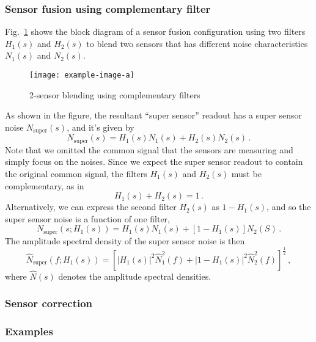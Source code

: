 \subsubsection{Sensor fusion using complementary filter \label{sec:complementary_filter}}
Fig.~\ref{fig:complementary_filter} shows the block diagram of a sensor fusion configuration using two filters $H_1(s)$ and $H_2(s)$ to blend two sensors that has different noise characteristics $N_1(s)$ and $N_2(s)$. 
\begin{figure}[!h]
	\centering
	\texttt{[image: example-image-a]}
	\caption{2-sensor blending using complementary filters}
	\label{fig:complementary_filter}
\end{figure}
As shown in the figure, the resultant ``super sensor'' readout has a super sensor noise $N_\mathrm{super}(s)$, and it's given by
\begin{equation}
	N_\mathrm{super}(s) = H_1(s)N_1(s) + H_2(s)N_2(s)\,.
\end{equation}
Note that we omitted the common signal that the sensors are measuring and simply focus on the noises.
Since we expect the super sensor readout to contain the original common signal, the  filters $H_1(s)$ and $H_2(s)$ must be complementary, as in
\begin{equation}
	H_1(s) + H_2(s) = 1\,.
\end{equation}
Alternatively, we can express the second filter $H_2(s)$ as $1-H_1(s)$, and so the super sensor noise is a function of one filter,
\begin{equation}
	N_\mathrm{super}(s; H_1(s)) = H_1(s)N_1(s) + \left[1-H_1(s)\right]N_2(S)\,.
\end{equation}
The amplitude spectral density of the super sensor noise is then
\begin{equation}
	\hat{N}_\mathrm{super}(f; H_1(s)) = \left[\left\lvert H_1(s) \right\rvert^2\hat{N}_1^2(f) + \left\lvert 1-H_1(s) \right\rvert^2\hat{N}_2^2(f)\right]^\frac{1}{2}\,,
\end{equation}
where $\hat{N}(s)$ denotes the amplitude spectral densities.


\subsubsection{Sensor correction \label{sec:sensor_correction}}
\subsubsection{Examples \label{sec:sensor_fusion_examples}}